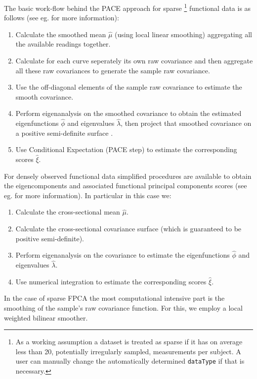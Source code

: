 \documentclass[11pt,english]{article}
\begin{document}
The basic work-flow behind the PACE approach for sparse \footnote{As a working assumption a dataset is treated as sparse if it has on average less than 20, potentially irregularly sampled, measurements per subject. A user can manually change the automatically determined \texttt{dataType} if that is necessary.} functional data is as follows (see eg. \cite{Yao05, Liu09} for more information):
\begin{enumerate}
\item Calculate the smoothed mean $\hat{\mu}$ (using local linear smoothing) aggregating all the available readings together. 
\item Calculate for each curve seperately its own raw covariance and then aggregate all these raw covariances to generate the sample raw covariance.
\item Use the off-diagonal elements of the sample raw covariance to estimate the smooth covariance.
\item Perform eigenanalysis on the smoothed covariance to obtain the estimated eigenfunctions $\hat{\phi}$ and eigenvalues $\hat{\lambda}$, then project that smoothed covariance on a positive semi-definite surface \cite{Hall2008}.
\item Use Conditional Expectation (PACE step) to estimate the corresponding scores $\hat{\xi}$. 
\end{enumerate}
For densely observed functional data simplified procedures are available to obtain the eigencomponents and associated functional principal components scores (see eg. \cite{Castro86} for more information). In particular in this case we:
\begin{enumerate}
\item Calculate the cross-sectional mean $\hat{\mu}$.
\item Calculate the cross-sectional covariance surface (which is guaranteed to be positive semi-definite).
\item Perform eigenanalysis on the covariance to estimate the eigenfunctions $\hat{\phi}$ and eigenvalues $\hat{\lambda}$.
\item Use numerical integration to estimate the corresponding scores $\hat{\xi}$.
\end{enumerate}
In the case of sparse FPCA the most computational intensive part is the smoothing of the sample's raw covariance function. For this, we employ a local weighted bilinear smoother. 
\end{document}
